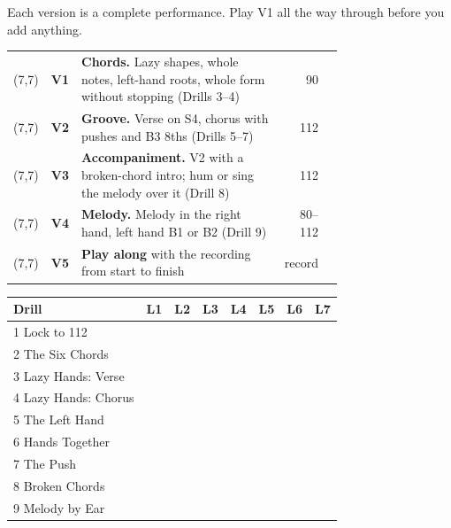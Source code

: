 \documentclass[10pt]{article}
\makeatletter
\newcommand{\sect}[1]{\par\vspace{5pt}{\large\bfseries #1}\par\vspace{2pt}}
\newcommand{\cb}{\framebox(7,7){}}
\newenvironment{ladder}{\begin{tcolorbox}[enhanced,colback=white,colframe=black,boxrule=0.8pt,arc=2mm,
  colbacktitle=black!12,coltitle=black,fonttitle=\small\bfseries,
  title={Level ladder --- stay on a level for days or weeks; tick it when you play it clean 3 times in a row},
  left=0mm,right=0mm,top=0.5mm,bottom=0.5mm,before skip=4pt,after skip=4pt]\small
  \renewcommand{\arraystretch}{1.12}\begin{tabular}{@{\hspace{1mm}}c@{\hspace{1.5mm}}l@{\hspace{1.5mm}}p{0.745\linewidth} r@{\hspace{2mm}}p{13mm}@{}}}
  {\end{tabular}\end{tcolorbox}}
\newcommand{\lv}[3]{\cb & \textbf{#1} & #2 & \footnotesize #3 & \rule[-1pt]{13mm}{0.4pt}\\}
\makeatother
\begin{document}
\sect{Five versions of the song}
Each version is a complete performance. Play V1 all the way through before you add anything.\par\vspace{3pt}
\begin{ladder}
\lv{V1}{\textbf{Chords.} Lazy shapes, whole notes, left-hand roots, whole form without stopping (Drills 3--4)}{90}
\lv{V2}{\textbf{Groove.} Verse on S4, chorus with pushes and B3 8ths (Drills 5--7)}{112}
\lv{V3}{\textbf{Accompaniment.} V2 with a broken-chord intro; hum or sing the melody over it (Drill 8)}{112}
\lv{V4}{\textbf{Melody.} Melody in the right hand, left hand B1 or B2 (Drill 9)}{80--112}
\lv{V5}{\textbf{Play along} with the recording from start to finish}{record}
\end{ladder}

\sect{Progress log (write the date when you tick a level)}
\small
\renewcommand{\arraystretch}{1.55}
\begin{tabularx}{\textwidth}{|l|*{7}{X|}}
\hline
\textbf{Drill} & \textbf{L1} & \textbf{L2} & \textbf{L3} & \textbf{L4} & \textbf{L5} & \textbf{L6} & \textbf{L7}\\\hline
1 Lock to 112 &&&&&&&\\\hline
2 The Six Chords &&&&&&&\\\hline
3 Lazy Hands: Verse &&&&&&&\\\hline
4 Lazy Hands: Chorus &&&&&&&\\\hline
5 The Left Hand &&&&&&&\\\hline
6 Hands Together &&&&&&&\\\hline
7 The Push &&&&&&&\\\hline
8 Broken Chords &&&&&&&\\\hline
9 Melody by Ear &&&&&&&\\\hline
\end{tabularx}
\end{document}
